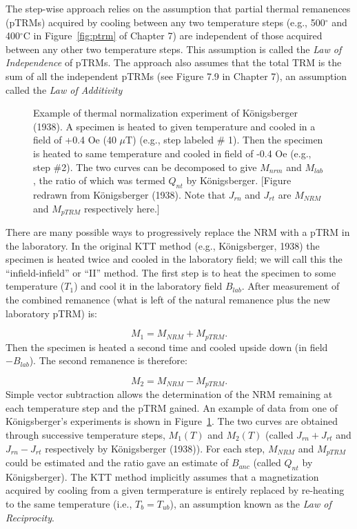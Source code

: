    The step-wise approach relies on the assumption that partial thermal remanences (pTRMs) acquired by cooling between any two temperature steps (e.g., 500$^{\circ}$ and 400$^{\circ}$C in Figure~\ref{fig:ptrm}  of Chapter 7) are independent of those acquired between any other two temperature steps.  This assumption is called the 
{\it Law of Independence} of  pTRMs.  The approach also assumes that the total TRM is the sum of all the independent pTRMs (see Figure 7.9 in Chapter 7), an assumption called the 
{\it Law of Additivity}  
   
\begin{figure}[h!tb]
\epsfxsize 7cm
\centering {}
\caption{Example of thermal normalization experiment of K\"onigsberger (1938).  A specimen is heated to given temperature and cooled in a field of +0.4 Oe (40 $\mu$T) (e.g., step labeled \# 1).  Then the specimen is heated to same temperature and cooled in field of -0.4 Oe (e.g., step \#2).  The two curves can be decomposed to give $M_{nrm}$ and $M_{lab}$, the ratio of which was termed $Q_{nt}$ by K\"onigsberger.  [Figure redrawn from K\"onigsberger (1938).  Note that $J_{rn}$ and $J_{rt}$ are $M_{NRM}$ and $M_{pTRM}$ respectively here.]}
\label{fig:koenigsberger}
\end{figure}
  
There are many possible  ways  to progressively replace the NRM with a pTRM in the laboratory.  In the original KTT method (e.g., K\"onigsberger, 1938)  the specimen is heated twice and cooled in the laboratory field; we will call this  the ``infield-infield'' or ``II'' method.  The first step is  to heat the specimen to some temperature ($T_1$) and cool it  in the laboratory field $B_{lab}$.  After measurement of  the combined remanence (what is left of the natural remanence plus the new laboratory pTRM) is:

$$
 M_{1} = M_{NRM} + M_{ pTRM}. 
$$
\noindent  Then the specimen  is heated a second time and cooled upside down (in field $-B_{lab}$).  The second remanence is therefore:

$$
 M_{2} = M_{NRM} -M_{ pTRM}. 
$$
\noindent Simple vector subtraction allows the determination of the NRM remaining at each temperature step and the pTRM gained.  An example of data from one of K\"onigsberger's experiments is shown in Figure~\ref{fig:koenigsberger}. The two curves are obtained through successive temperature steps,  $M_1(T)$ and $M_2(T)$  (called $J_{rn}+J_{rt}$ and $J_{rn}-J_{rt}$ respectively by 
\nocite{koenigsberger38}
K\"onigsberger (1938)).  For each step, $M_{NRM}$ and $M_{pTRM}$ could be estimated and the ratio gave an estimate of $B_{anc}$ (called $Q_{nt}$ by K\"onigsberger).   The KTT method implicitly assumes that a magnetization acquired by cooling from a given termperature is entirely replaced by re-heating to the same temperature (i.e., $T_b=T_{ub}$), an assumption known as the 
{\it Law of Reciprocity}.


